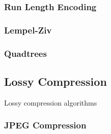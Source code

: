 			
			\subsubsection{Run Length Encoding}
			
			\subsubsection{Lempel-Ziv}
			
			\subsubsection{Quadtrees}
		
		\subsection{Lossy Compression}
			Lossy compression algorithms 
			\subsubsection{JPEG Compression}